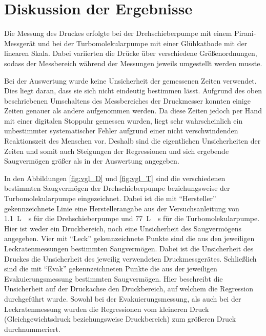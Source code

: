 \section{Diskussion der Ergebnisse}
\label{sec:Diskussion}


Die Messung des Druckes erfolgte bei der Drehschieberpumpe mit einem
Pirani-Messgerät und bei der Turbomolekularpumpe mit einer Glühkathode mit der
linearen Skala. Dabei variierten die Drücke über verschiedene Größenordnungen,
sodass der Messbereich während der Messungen jeweils umgestellt werden musste.

Bei der Auswertung wurde keine Unsicherheit der gemessenen Zeiten verwendet.
Dies liegt daran, dass sie sich nicht eindeutig bestimmen lässt.
Aufgrund des oben beschriebenen Umschaltens des Messbereiches der Druckmesser konnten
einige Zeiten genauer als andere aufgenommen werden.
Da diese Zeiten jedoch per Hand mit einer digitalen Stoppuhr gemessen wurden,
liegt sehr wahrscheinlich ein unbestimmter systematischer Fehler aufgrund einer
nicht verschwindenden Reaktionszeit des Menschen vor.
Deshalb sind die eigentlichen Unsicherheiten der Zeiten und somit auch
Steigungen der Regressionen und sich ergebende Saugvermögen größer als
in der Auswertung angegeben.

In den Abbildungen \ref{fig:vgl_D} und \ref{fig:vgl_T} sind die verschiedenen
bestimmten Saugvermögen der Drehschieberpumpe beziehungsweise der
Turbomolekularpumpe eingezeichnet.
Dabei ist die mit \enquote{Hersteller} gekennzeichnete Linie eine Herstellerangabe
aus der Versuchsanleitung \cite{anleitung} von \SI{1.1}{\liter{}\second}
für die Drehschieberpumpe und \SI{77}{\liter{}\second} für die
Turbomolekularpumpe. Hier ist weder ein Druckbereich, noch eine Unsicherheit des
Saugvermögens angegeben.
Vier mit \enquote{Leck} gekennzeichnete Punkte sind die aus den jeweiligen
Leckratenmessungen bestimmten Saugvermögen. Dabei ist die Unsicherheit des
Druckes die Unsicherheit des jeweilig verwendeten Druckmessgerätes.
Schließlich sind die mit \enquote{Evak} gekennzeichneten Punkte die aus der
jeweiligen Evakuierungsmessung bestimmten Saugvermögen. Hier beschreibt die
Unsicherheit auf der Druckachse den Druckbereich, auf welchem die Regression
durchgeführt wurde.
Sowohl bei der Evakuierungsmessung, als auch bei der Leckratenmessung wurden die
Regressionen vom kleineren Druck (Gleichgewichtsdruck beziehungsweise Druckbereich)
zum größeren Druck durchnummeriert.

